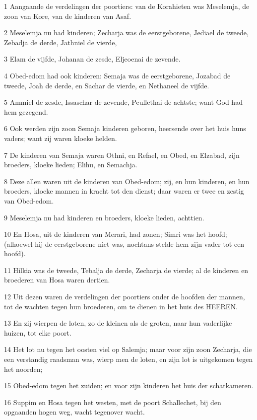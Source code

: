 \par 1 Aangaande de verdelingen der poortiers: van de Korahieten was Meselemja, de zoon van Kore, van de kinderen van Asaf.
\par 2 Meselemja nu had kinderen; Zecharja was de eerstgeborene, Jediael de tweede, Zebadja de derde, Jathniel de vierde,
\par 3 Elam de vijfde, Johanan de zesde, Eljeoenai de zevende.
\par 4 Obed-edom had ook kinderen: Semaja was de eerstgeborene, Jozabad de tweede, Joah de derde, en Sachar de vierde, en Nethaneel de vijfde.
\par 5 Ammiel de zesde, Issaschar de zevende, Peullethai de achtste; want God had hem gezegend.
\par 6 Ook werden zijn zoon Semaja kinderen geboren, heersende over het huis huns vaders; want zij waren kloeke helden.
\par 7 De kinderen van Semaja waren Othni, en Refael, en Obed, en Elzabad, zijn broeders, kloeke lieden; Elihu, en Semachja.
\par 8 Deze allen waren uit de kinderen van Obed-edom; zij, en hun kinderen, en hun broeders, kloeke mannen in kracht tot den dienst; daar waren er twee en zestig van Obed-edom.
\par 9 Meselemja nu had kinderen en broeders, kloeke lieden, achttien.
\par 10 En Hosa, uit de kinderen van Merari, had zonen; Simri was het hoofd; (alhoewel hij de eerstgeborene niet was, nochtans stelde hem zijn vader tot een hoofd).
\par 11 Hilkia was de tweede, Tebalja de derde, Zecharja de vierde; al de kinderen en broederen van Hosa waren dertien.
\par 12 Uit dezen waren de verdelingen der poortiers onder de hoofden der mannen, tot de wachten tegen hun broederen, om te dienen in het huis des HEEREN.
\par 13 En zij wierpen de loten, zo de kleinen als de groten, naar hun vaderlijke huizen, tot elke poort.
\par 14 Het lot nu tegen het oosten viel op Salemja; maar voor zijn zoon Zecharja, die een verstandig raadsman was, wierp men de loten, en zijn lot is uitgekomen tegen het noorden;
\par 15 Obed-edom tegen het zuiden; en voor zijn kinderen het huis der schatkameren.
\par 16 Suppim en Hosa tegen het westen, met de poort Schallechet, bij den opgaanden hogen weg, wacht tegenover wacht.
